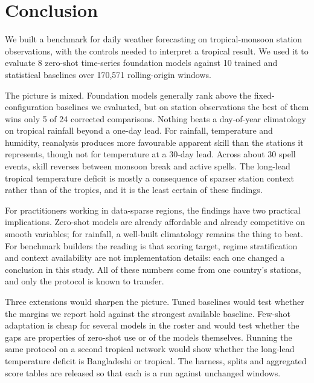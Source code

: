 \section{Conclusion}
\label{sec:conclusion}

We built a benchmark for daily weather forecasting on tropical-monsoon station observations, with the controls
needed to interpret a tropical result. We used it to evaluate 8 zero-shot time-series foundation models against
10 trained and statistical baselines over 170{,}571 rolling-origin windows.

The picture is mixed. Foundation models generally rank above the fixed-configuration baselines we evaluated, but
on station observations the best of them wins only 5 of 24 corrected comparisons. Nothing beats a day-of-year
climatology on tropical rainfall beyond a one-day lead. For rainfall, temperature and humidity, reanalysis produces more
favourable apparent skill than the stations it represents, though not for temperature at a 30-day lead. Across
about 30 spell events, skill reverses between monsoon break and active spells. The long-lead tropical temperature deficit is mostly a consequence of sparser station context rather than
of the tropics, and it is the least certain of these findings.

For practitioners working in data-sparse regions, the findings have two practical implications. Zero-shot models are already
affordable and already competitive on smooth variables; for rainfall, a well-built climatology remains the thing
to beat. For benchmark builders the reading is that scoring target, regime stratification and context availability
are not implementation details: each one changed a conclusion in this study. All of these numbers come from one
country's stations, and only the protocol is known to transfer.

Three extensions would sharpen the picture. Tuned baselines would test whether the margins we report hold against the strongest available baseline. Few-shot adaptation is cheap for
several models in the roster and would test whether the gaps are properties of zero-shot use or of the models
themselves. Running the same protocol on a second tropical network would show whether the long-lead temperature
deficit is Bangladeshi or tropical. The harness, splits and aggregated score tables are released so that each is a
run against unchanged windows.
